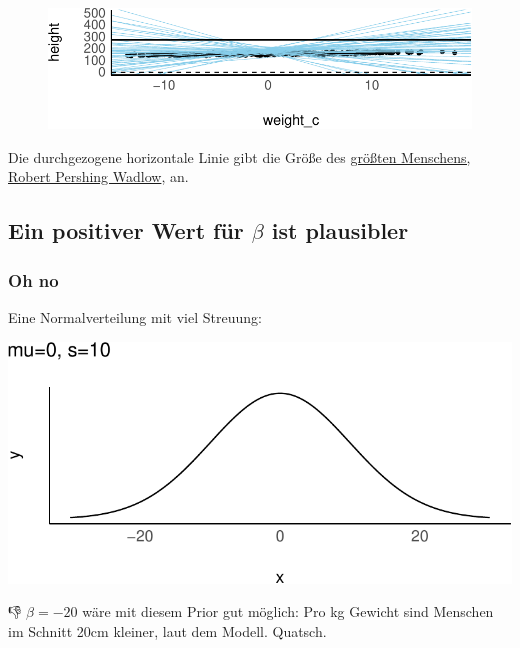 \documentclass[
  a4paper,
  DIV=11]{scrreprt}
\theoremstyle{definition}
\theoremstyle{remark}
\begin{document}
\begin{figure}[H]

{\centering \includegraphics{./lineare-modelle_files/figure-pdf/unnamed-chunk-11-1.pdf}

}

\end{figure}

Die durchgezogene horizontale Linie gibt die Größe des
\href{https://en.wikipedia.org/wiki/Robert_Wadlow}{größten Menschens,
Robert Pershing Wadlow}, an.

\hypertarget{ein-positiver-wert-fuxfcr-beta-ist-plausibler}{%
\subsection{\texorpdfstring{Ein positiver Wert für \(\beta\) ist
plausibler}{Ein positiver Wert für \textbackslash beta ist plausibler}}\label{ein-positiver-wert-fuxfcr-beta-ist-plausibler}}

\hypertarget{oh-no}{%
\subsubsection{Oh no}\label{oh-no}}

Eine Normalverteilung mit viel Streuung:

\includegraphics{./lineare-modelle_files/figure-pdf/Post-Regression-16-1.pdf}

👎 \(\beta=-20\) wäre mit diesem Prior gut möglich: Pro kg Gewicht sind
Menschen im Schnitt 20cm kleiner, laut dem Modell. Quatsch.
\end{document}
